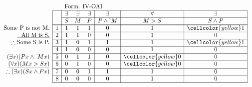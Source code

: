 \documentclass[10pt,legalpaper,landscape,cmtt]{article}
\begin{document}
{\begin{minipage}[t]{3.25in}
	\)
\end{minipage}\begin{minipage}[t]{3.25in}
	\(
	\begin{array}{r|c|ccc|c|c|c|}
		\multicolumn{2}{c}{}&\multicolumn{6}{l}{\mbox{Form: IV-OAI}} \\ \cline{2-8}
		\hspace{1in}	&	& \exists & \exists & \exists & \exists & \forall & \exists\\ \cline{3-8}
		&	& S & M & P &  P \wedge \tilde~M  &  M > S  &  S \wedge P \\ \cline{2-8} \cline{2-8}
		\phantom{\therefore}\mbox{Some P is not M.}   & 1 & 1 & 1 & 1 &   0   &   1   &   \cellcolor{yellow} 1  \\ \cline{2-8}
		\underline{\phantom{\therefore}\mbox{All M is S.}}   & 2 & 1 & 1 & 0 &   0   &   1   &   0  \\ \cline{2-8}
		\therefore \mbox{Some S is P.}   & 3 & 1 & 0 & 1 &   1   &   1   &   \cellcolor{yellow} 1  \\ \cline{2-8}
		& 4 & 1 & 0 & 0 &   0   &   1   &   0  \\ \cline{2-8}
		(\exists x)(Px \wedge \tilde~Mx)   & 5 & 0 & 1 & 1 &   0   &   \cellcolor{yellow} 0   &   0  \\ \cline{2-8}
		\underline{(\forall x)(Mx > Sx)}   & 6 & 0 & 1 & 0 &   0   &   \cellcolor{yellow} 0   &   0  \\ \cline{2-8}
		\therefore(\exists x)(Sx \wedge Px)   & 7 & 0 & 0 & 1 &   1   &   1   &   0  \\ \cline{2-8}
		& 8 & 0 & 0 & 0 &   0   &   1   &   0   \\ \cline{2-8}\cline{2-8} 
	\end{array}
	\)
\end{minipage}

}
\end{document}
